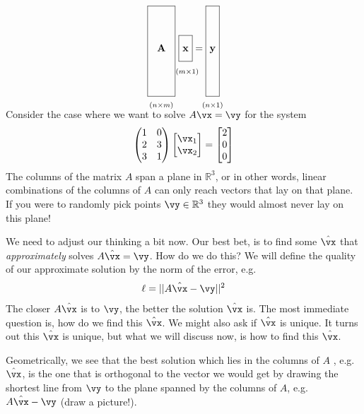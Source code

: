\documentclass[a4paper,11pt]{exam}
\newcommand*{\clapp}[1]{\hbox to 0pt{\hss#1\hss}}
\newcommand*{\mat}[1]{\boldsymbol{\mathrm{#1}}}
\newcommand*{\subdims}[3]{\clapp{\raisebox{#1}[0pt][0pt]{$\scriptstyle(#2 \times #3)$}}}
\newcounter{ct}
\newcommand{\field}[1]{\ensuremath{\mathbb{#1}}}
\newcommand{\reals}{\field{R}}
\begin{document}
\begin{align}
    \framebox[1.0cm]{\clapp{\raisebox{0pt}[1.5cm][1.5cm]{$\mat A$}}\subdims{-2.0cm} n m} \ 
    \framebox[0.5cm]{\clapp{\raisebox{0mm}[4.5mm][2.5mm]{$\,\,\mat x$}}       \subdims{-8mm} m 1}
    =
    \framebox[0.5cm]{\clapp{\raisebox{0pt}[1.5cm][1.5cm]{$\mat y$}}\subdims{-2.0cm} n 1}
\end{align}
\vspace{5pt}
\begin{tcolorbox}[colback=black!1!,title=A motivating example]
    Consider the case where we want to solve $A\vx = \vy$ for the system
    \begin{align}
        \begin{pmatrix} 1 & 0 \\ 2 & 3 \\ 3 & 1 \end{pmatrix} \begin{bmatrix} \vx_1 \\ \vx_2 \end{bmatrix} = \begin{bmatrix} 2 \\ 0 \\ 0 \end{bmatrix}
    \end{align}
    The columns of the matrix $A$ span a plane in $\reals^3$, or in other words, linear combinations of the columns of $A$ can only reach vectors that lay on that plane.  If you were to randomly pick points $\vy \in \reals^3$ they would almost never lay on this plane!

    We need to adjust our thinking a bit now. Our best bet, is to find some $\hat{\vx}$ that \textit{approximately} solves $A\hat{\vx} = \vy$. How do we do this? We will define the quality of our approximate solution by the norm of the error, e.g.
    \begin{align}
        \ell = || A \hat{\vx} - \vy ||^2
    \end{align}
    The closer $A \hat{\vx}$ is to $\vy$, the better the solution $\hat{\vx}$ is.  The most immediate question is, how do we find this $\hat{\vx}$. We might also ask if $\hat{\vx}$ is unique. It turns out this $\hat{\vx}$ is unique, but what we will discuss now, is how to find this $\hat{\vx}$.
\end{tcolorbox}
Geometrically, we see that the best solution which lies in the columns of $A$ , e.g. $\hat{\vx}$, is the one that is orthogonal to the vector we would get by drawing the shortest line from $\vy$ to the plane spanned by the columns of $A$, e.g. $A\hat{\vx} - \vy$ (draw a picture!).  
\end{document}
